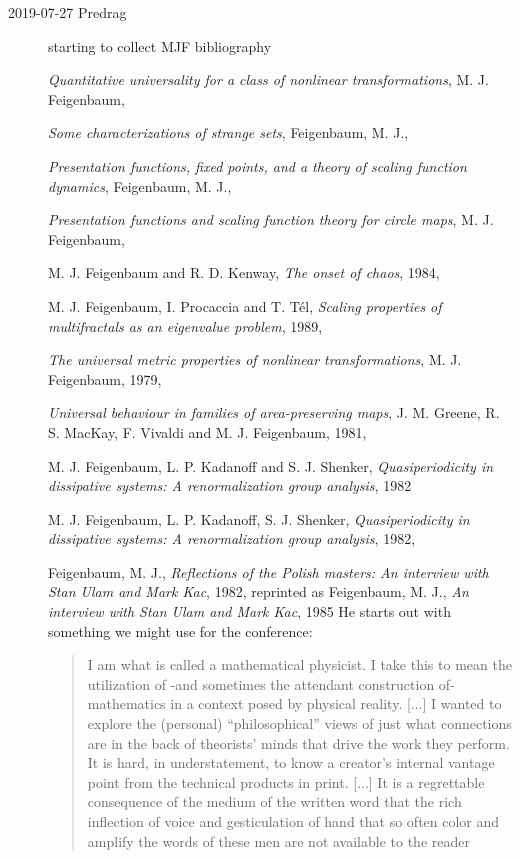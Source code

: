 \begin{description}
\item[2019-07-27 Predrag]
starting to collect MJF bibliography

{\em Quantitative universality for a class of nonlinear transformations},
{M. J. Feigenbaum},

{\em Some characterizations of strange sets},
{Feigenbaum, M. J.},

{\em Presentation functions, fixed points, and a theory of scaling function dynamics},
{Feigenbaum, M. J.},

{\em Presentation functions and scaling function theory for circle maps},
{M. J. Feigenbaum},

{M. J. Feigenbaum and R. D. Kenway},
{\em The onset of chaos},
{1984},

{M. J. Feigenbaum, I. Procaccia and T. T{\'e}l},
  {\em Scaling properties of multifractals as an eigenvalue problem},
{1989},

{\em The universal metric properties of nonlinear transformations},
{M. J. Feigenbaum},
{1979},

{\em Universal behaviour in families of area-preserving maps},
{J. M. Greene, R. S. MacKay, F. Vivaldi and M. J. Feigenbaum},
{1981},

{M. J. Feigenbaum, L. P. Kadanoff and S. J. Shenker},
  {\em Quasiperiodicity in dissipative systems: {A} renormalization group analysis},
{1982}

{M. J. Feigenbaum, L. P. Kadanoff, S. J. Shenker},
  {\em Quasiperiodicity in dissipative systems: {A} renormalization group analysis},
{1982},

{Feigenbaum, M. J.},
{\em Reflections of the {Polish} masters: {An} interview with {Stan Ulam} and {Mark Kac}},
{1982},
reprinted as
{Feigenbaum, M. J.},
  {\em An interview with {Stan Ulam} and {Mark Kac}},
  {1985}
He starts out with something we might use for the conference:

\begin{quote}
I am what is called a mathematical physicist. I take this to mean the
utilization of -and sometimes the attendant construction of- mathematics
in a context posed by physical reality.
[...]
I wanted to explore the (personal) ``philosophical'' views of just what
connections are in the back of theorists' minds that drive the work they
perform. It is hard, in understatement, to know a creator's internal
vantage point from the technical products in print.
[...]
It is a regrettable consequence of the medium of the
written word that the rich inflection of voice and gesticulation of
hand that so often color and amplify the words of these men are not
available to the reader
\end{quote}


\end{description}

